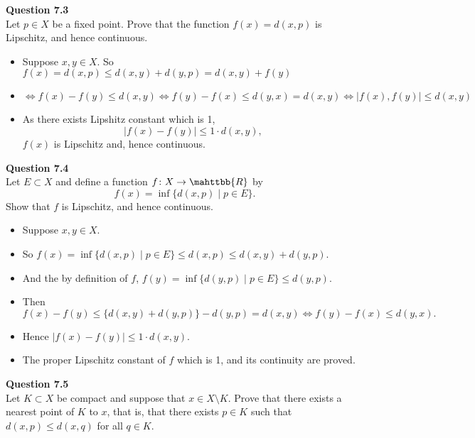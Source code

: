 \documentclass[12pt]{article}
\begin{document}
\newpage                                                                                          
\textbf{Question 7.3}\\
Let $p\in X$ be a fixed point. Prove that the function $f(x)=d(x,p)$ is Lipschitz, and hence continuous.
\begin{itemize}
    \item Suppose $x,y\in X$. So $f(x) = d(x,p) \le d(x,y)+d(y,p) = d(x,y)+ f(y)$
    \item $\Leftrightarrow f(x)-f(y) \le d(x,y) \Leftrightarrow f(y)-f(x) \le d(y,x)=d(x,y)
    \Leftrightarrow |f(x),f(y)| \le d(x,y)$
    \item As there exists Lipshitz constant which is 1, $$|f(x)-f(y)|\le 1\cdot d(x,y),$$ $f(x)$ is Lipschitz and, hence continuous.
    
\end{itemize}

\vspace{1.5\baselineskip}
\textbf{Question 7.4}\\
Let $E\subset X$ and define a function $f\colon X\rightarrow \mahttbb{R}$ by $$f(x) = \inf\{d(x,p)\;|\;p\in E\}.$$
Show that $f$ is Lipschitz, and hence continuous.
\begin{itemize}
    \item Suppose $x,y\in X$. 
    \item So $f(x) = \inf\{d(x,p)\;|\;p\in E\}\le d(x,p) \le d(x,y)+d(y,p).$
    \item And the by definition of $f$, $f(y) = \inf\{d(y,p)\;|\;p\in E\}\le d(y,p).$
    \item Then $f(x)-f(y) \le \{d(x,y)+d(y,p)\}-d(y,p) = d(x,y) \Leftrightarrow f(y)-f(x) \le d(y,x).$
    \item Hence $|f(x)-f(y)| \le 1\cdot d(x,y)$.
    \item The proper Lipschitz constant of $f$ which is 1, and its continuity are proved.
    
\end{itemize}


\vspace{1.5\baselineskip}
\textbf{Question 7.5}\\
Let $K\subset X$ be compact and suppose that $x\in X\setminus K$. Prove that there exists a nearest point of $K$ to $x$, that is, that there exists $p\in K$ such that $d(x,p)\le d(x,q)$ for all $q\in K$.
\end{document}
